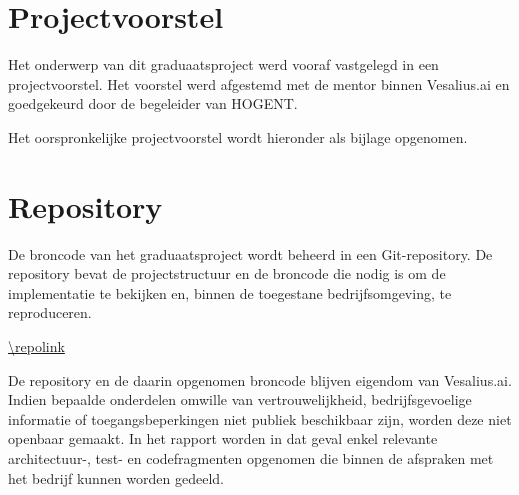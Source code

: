 \documentclass[dutch,dit,report]{hogentreport}
\begin{document}
\appendix

\chapter{Projectvoorstel}

Het onderwerp van dit graduaatsproject werd vooraf vastgelegd in een
projectvoorstel. Het voorstel werd afgestemd met de mentor binnen Vesalius.ai
en goedgekeurd door de begeleider van HOGENT.

Het oorspronkelijke projectvoorstel wordt hieronder als bijlage opgenomen.



\chapter{Repository}

De broncode van het graduaatsproject wordt beheerd in een Git-repository.
De repository bevat de projectstructuur en de broncode die nodig is om de
implementatie te bekijken en, binnen de toegestane bedrijfsomgeving, te
reproduceren.

\begin{center}
    \url{\repolink}
\end{center}

De repository en de daarin opgenomen broncode blijven eigendom van Vesalius.ai.
Indien bepaalde onderdelen omwille van vertrouwelijkheid, bedrijfsgevoelige
informatie of toegangsbeperkingen niet publiek beschikbaar zijn, worden deze
niet openbaar gemaakt. In het rapport worden in dat geval enkel relevante
architectuur-, test- en codefragmenten opgenomen die binnen de afspraken met
het bedrijf kunnen worden gedeeld.


\end{document}
